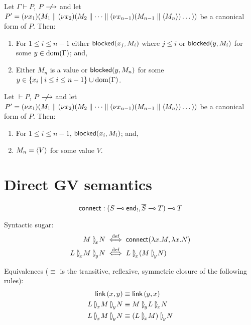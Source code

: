 \documentclass[orivec,envcountsame]{llncs}
\begin{document}
\begin{theorem}
  Let $\Gamma \vdash P$, $P \centernot\ceval$ and let $P' = (\nu x_1)(M_1 \parallel (\nu
  x_2)(M_2 \parallel \dots \parallel (\nu x_{n-1})(M_{n-1} \parallel \langle M_n \rangle)\dots))$ be
  a canonical form of $P$.  Then:
  \begin{enumerate}
  \item For $1 \leq i \leq n - 1$ either $\mathsf{blocked}(x_j,M_i)$ where $j \leq i$ or $\mathsf{blocked}(y,M_i)$
    for some $y \in \operatorname{dom}(\Gamma)$; and,
  \item Either $M_n$ is a value or $\mathsf{blocked}(y,M_n)$ for some $y \in \{ x_i \mid i \leq i \leq n -
    1 \} \cup \operatorname{dom}(\Gamma)$.
  \end{enumerate}
\end{theorem}

\begin{corollary}
  Let $\vdash P$, $P \centernot\ceval$ and let $P' = (\nu x_1)(M_1 \parallel (\nu
  x_2)(M_2 \parallel \dots \parallel (\nu x_{n-1})(M_{n-1} \parallel \langle M_n \rangle)\dots))$ be
  a canonical form of $P$.  Then:
  \begin{enumerate}
  \item For $1 \leq i \leq n - 1$, $\mathsf{blocked}(x_i,M_i)$; and,
  \item $M_n = \langle V \rangle$ for some value $V$.
  \end{enumerate}
\end{corollary}

\section{Direct GV semantics}

\newcommand{\rpar}[1]{\mathbin{{[}\:\!\!\rangle}_{\!{#1}}\!}
\newcommand{\lrpar}[1]{\mathbin{\langle\hspace{-.3ex}\rangle}_{\!{#1}}\!}
\newcommand{\lpar}[1]{\mathbin{\langle\:\!\!{]}}_{{#1}}\!}

\newcommand{\con}[3]{{#1} \rpar{#2} {#3}}

\[
\mathsf{connect} : (S \multimap \mathsf{end}_!, \overline{S} \multimap T) \multimap T
\]

Syntactic sugar:
\begin{align*}
\con{M}{x}{N} &\defiff \mkwd{connect}(\lambda x.M, \lambda x.N) \\
\con{L}{x}{\con{M}{y}{N}} &\defiff \con{L}{x}{(\con{M}{y}{N})} \\
\end{align*}

Equivalences ($\equiv$ is the transitive, reflexive, symmetric closure of the following rules):
\begin{align*}
\mkwd{link}\,(x,y) &\equiv \mkwd{link}\,(y,x) \\
\con{L}{x}{\con{M}{y}{N}} &\equiv \con{M}{y}{\con{L}{x}{N}} \\
\con{L}{x}{\con{M}{y}{N}} &\equiv \con{(\con{L}{x}{M})}{y}{N} \\
\end{align*}
\end{document}
